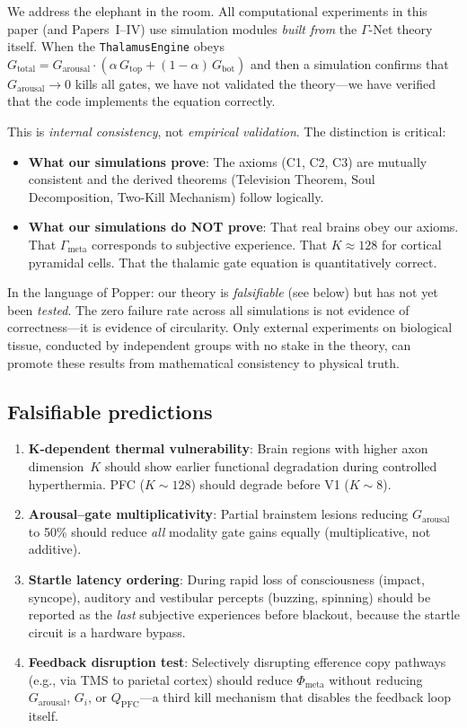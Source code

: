 \documentclass[aps,pre,twocolumn,superscriptaddress,floatfix]{revtex4-2}
\newcommand{\Phimeta}{\Phi_{\text{meta}}}
\newcommand{\Zarousal}{G_{\text{arousal}}}
\newcommand{\QPFC}{Q_{\text{PFC}}}
\begin{document}
We address the elephant in the room.
All computational experiments in this paper (and Papers~I--IV)
use simulation modules \emph{built from} the $\Gamma$-Net
theory itself.  When the \texttt{ThalamusEngine} obeys
$G_{\text{total}}=G_{\text{arousal}}\cdot(\alpha\,G_{\text{top}}+(1-\alpha)\,G_{\text{bot}})$
and then a simulation confirms that $G_{\text{arousal}}\to 0$
kills all gates, we have not validated the theory---we have
verified that the code implements the equation correctly.

This is \emph{internal consistency}, not \emph{empirical
validation}.  The distinction is critical:
\begin{itemize}
  \item \textbf{What our simulations prove}:
    The axioms (C1, C2, C3) are mutually consistent and the
    derived theorems (Television Theorem, Soul Decomposition,
    Two-Kill Mechanism) follow logically.
  \item \textbf{What our simulations do NOT prove}:
    That real brains obey our axioms.
    That $\Gamma_{\text{meta}}$ corresponds to subjective
    experience.  That $K\approx 128$ for cortical pyramidal
    cells.  That the thalamic gate equation is quantitatively
    correct.
\end{itemize}

In the language of Popper: our theory is \emph{falsifiable}
(see below) but has not yet been \emph{tested}.  The zero
failure rate across all simulations is not evidence of
correctness---it is evidence of circularity.
Only external experiments on biological tissue, conducted by
independent groups with no stake in the theory, can
promote these results from mathematical consistency to
physical truth.

\subsection{Falsifiable predictions}

\begin{enumerate}
  \item \textbf{K-dependent thermal vulnerability}:
    Brain regions with higher axon dimension~$K$ should show
    earlier functional degradation during controlled hyperthermia.
    PFC ($K\sim 128$) should degrade before V1 ($K\sim 8$).
  \item \textbf{Arousal--gate multiplicativity}:
    Partial brainstem lesions reducing $\Zarousal$ to 50\%
    should reduce \emph{all} modality gate gains equally
    (multiplicative, not additive).
  \item \textbf{Startle latency ordering}:
    During rapid loss of consciousness (impact, syncope),
    auditory and vestibular percepts (buzzing, spinning)
    should be reported as the \emph{last} subjective
    experiences before blackout, because the startle
    circuit is a hardware bypass.
  \item \textbf{Feedback disruption test}:
    Selectively disrupting efference copy pathways
    (e.g., via TMS to parietal cortex) should reduce
    $\Phimeta$ without reducing $\Zarousal$, $G_i$,
    or $\QPFC$---a third kill mechanism that disables the
    feedback loop itself.
\end{enumerate}
\end{document}
